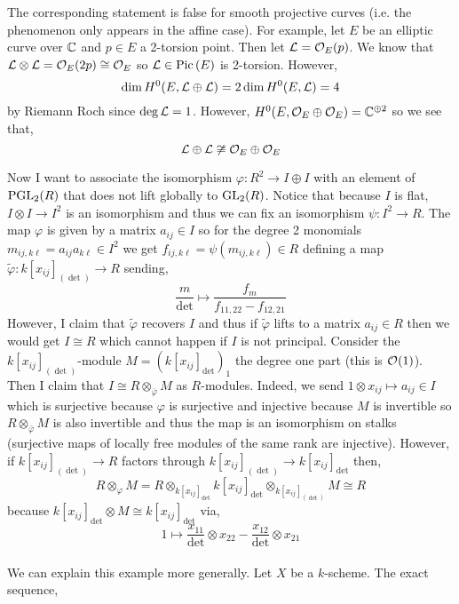 \documentclass[12pt]{article}
\begin{document}
\begin{rmk}
The corresponding statement is false for smooth projective curves (i.e. the phenomenon only appears in the affine case). For example, let $E$ be an elliptic curve over $\mathbb{C}$ and $p \in E$ a 2-torsion point. Then let $\mathcal{L} = \mathcal{O}_{E}(p)$. We know that $\mathcal{L} \otimes \mathcal{L} = \mathcal{O}_{E}(2p) \cong \mathcal{O}_{E}$ so $\mathcal{L} \in \mathrm{Pic} \left( E \right)$ is 2-torsion. However, 
\[ \dim H^0(E, \mathcal{L} \oplus \mathcal{L}) = 2 \dim H^0(E, \mathcal{L}) = 4 \]
by Riemann Roch since $\deg{\mathcal{L}} = 1$. However, $H^0(E, \mathcal{O}_{E} \oplus \mathcal{O}_{E}) = \mathbb{C}^{\oplus 2}$ so we see that,
\[ \mathcal{L} \oplus \mathcal{L} \not\cong \mathcal{O}_{E} \oplus \mathcal{O}_{E} \]
\end{rmk}
\noindent
Now I want to associate the isomorphism $\varphi : R^2 \to I \oplus I$ with an element of $\mathrm{PGL}_2(R)$ that does not lift globally to $\mathrm{GL}_2(R)$. Notice that because $I$ is flat, $I \otimes I \to I^2$ is an isomorphism and thus we can fix an isomorphism $\psi : I^2 \to R$. The map $\varphi$ is given by a matrix $a_{ij} \in I$ so for the degree 2 monomials $m_{ij,k\ell} = a_{ij} a_{k \ell} \in I^2$ we get $f_{ij,k\ell} = \psi(m_{ij,k\ell}) \in R$ defining a map $\tilde{\varphi} : k[x_{ij}]_{(\det)} \to R$ sending,
\[ \frac{m}{\det} \mapsto \frac{f_m}{f_{11,22} - f_{12,21}} \]
However, I claim that $\tilde{\varphi}$ recovers $I$ and thus if $\tilde{\varphi}$ lifts to a matrix $a_{ij} \in R$ then we would get $I \cong R$ which cannot happen if $I$ is not principal. Consider the $k[x_{ij}]_{(\det)}$-module $M = \left( k[x_{ij}]_{\det} \right)_1$ the degree one part (this is $\mathcal{O}_{}(1)$). Then I claim that $I \cong R \otimes_{\bar{\varphi}} M$ as $R$-modules. Indeed, we send $1 \otimes x_{ij} \mapsto a_{ij} \in I$ which is surjective because $\varphi$ is surjective and injective because $M$ is invertible so $ R \otimes_{\bar{\varphi}} M$ is also invertible and thus the map is an isomorphism on stalks (surjective maps of locally free modules of the same rank are injective). However, if $k[x_{ij}]_{(\det)} \to R$ factors through $k[x_{ij}]_{(\det)} \to k[x_{ij}]_{\det}$ then,
\[ R \otimes_{\varphi} M = R \otimes_{k[x_{ij}]_{\det}} k[x_{ij}]_{\det} \otimes_{k[x_{ij}]_{(\det)}} M \cong R \]
because $k[x_{ij}]_{\det} \otimes M \cong k[x_{ij}]_{\det}$ via,
\[ 1 \mapsto \frac{x_{11}}{\det} \otimes x_{22} - \frac{x_{12}}{\det} \otimes x_{21} \]
\bigskip\\
We can explain this example more generally. Let $X$ be a $k$-scheme. The exact sequence,
\begin{center}
\end{center}
\end{document}
